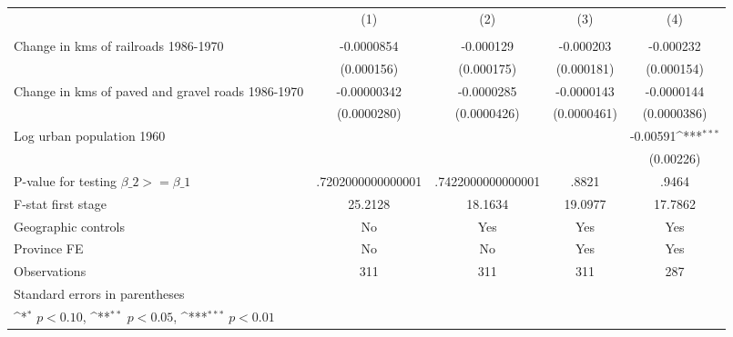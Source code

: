 {
\def\sym#1{\ifmmode^{#1}\else\(^{#1}\)\fi}
\begin{tabular}{l*{4}{c}}
\hline\hline
                &\multicolumn{1}{c}{(1)}&\multicolumn{1}{c}{(2)}&\multicolumn{1}{c}{(3)}&\multicolumn{1}{c}{(4)}\\
                &\multicolumn{1}{c}{}&\multicolumn{1}{c}{}&\multicolumn{1}{c}{}&\multicolumn{1}{c}{}\\
\hline
Change in kms of railroads 1986-1970&-0.0000854         &-0.000129         &-0.000203         &-0.000232         \\
                &(0.000156)         &(0.000175)         &(0.000181)         &(0.000154)         \\
[1em]
Change in kms of paved and gravel roads 1986-1970&-0.00000342         &-0.0000285         &-0.0000143         &-0.0000144         \\
                &(0.0000280)         &(0.0000426)         &(0.0000461)         &(0.0000386)         \\
[1em]
Log urban population 1960&                  &                  &                  & -0.00591\sym{***}\\
                &                  &                  &                  &(0.00226)         \\
\hline
P-value for testing $\beta\_{2} >= \beta\_{1}$&.7202000000000001         &.7422000000000001         &    .8821         &    .9464         \\
F-stat first stage&  25.2128         &  18.1634         &  19.0977         &  17.7862         \\
Geographic controls&       No         &      Yes         &      Yes         &      Yes         \\
Province FE     &       No         &       No         &      Yes         &      Yes         \\
Observations    &      311         &      311         &      311         &      287         \\
\hline\hline
\multicolumn{5}{l}{\footnotesize Standard errors in parentheses}\\
\multicolumn{5}{l}{\footnotesize \sym{*} \(p<0.10\), \sym{**} \(p<0.05\), \sym{***} \(p<0.01\)}\\
\end{tabular}
}
